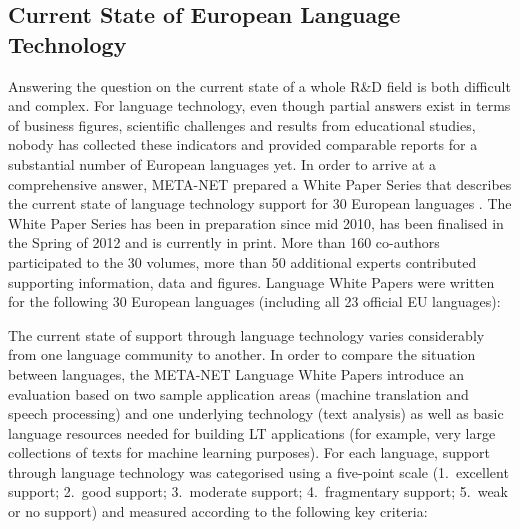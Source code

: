 \documentclass[10pt, plain]{../../metanetpaper}
\begin{document}
\begin{multicols}{2}

\subsection{Current State of European Language Technology}
\label{sec:what-current-state}

Answering the question on the current state of a whole R\&D field is both difficult and complex. For language technology, even though partial answers exist in terms of business figures, scientific challenges and results from educational studies, nobody has collected these indicators and provided comparable reports for a substantial number of European languages yet. In order to arrive at a comprehensive answer, META-NET prepared a White Paper Series that describes the current state of language technology support for 30 European languages \cite{LWP2012}. The White Paper Series has been in preparation since mid 2010, has been finalised in the Spring of 2012 and is currently in print. More than 160 co-authors participated to the 30 volumes, more than 50 additional experts contributed supporting information, data and figures. Language White Papers were written for the following 30 European languages (including all 23 official EU languages):

\medskip
\centerline{}

\medskip 
The current state of support through language technology varies considerably from one language community to another. In order to compare the situation between languages, the META-NET Language White Papers introduce an evaluation based on two sample application areas (machine translation and speech processing) and one underlying technology (text analysis) as well as basic language resources needed for building LT applications (for example, very large collections of texts for machine learning purposes). For each language, support through language technology was categorised using a five-point scale (1.~excellent support; 2.~good support; 3.~moderate support; 4.~fragmentary support; 5.~weak or no support) and measured according to the following key criteria:


\end{multicols}
\end{document}
